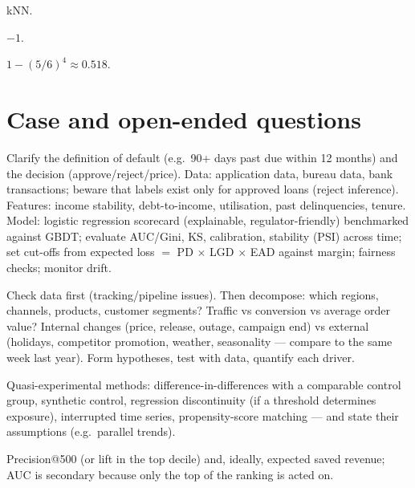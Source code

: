 \A kNN.

\A $-1$.

\A $1-(5/6)^4\approx0.518$.

\section{Case and open-ended questions}
\A Clarify the definition of default (e.g.\ 90+ days past due within 12 months) and the decision (approve/reject/price). Data: application data, bureau data, bank transactions; beware that labels exist only for approved loans (reject inference). Features: income stability, debt-to-income, utilisation, past delinquencies, tenure. Model: logistic regression scorecard (explainable, regulator-friendly) benchmarked against GBDT; evaluate AUC/Gini, KS, calibration, stability (PSI) across time; set cut-offs from expected loss $=$ PD $\times$ LGD $\times$ EAD against margin; fairness checks; monitor drift.

\A Check data first (tracking/pipeline issues). Then decompose: which regions, channels, products, customer segments? Traffic vs conversion vs average order value? Internal changes (price, release, outage, campaign end) vs external (holidays, competitor promotion, weather, seasonality --- compare to the same week last year). Form hypotheses, test with data, quantify each driver.

\A Quasi-experimental methods: difference-in-differences with a comparable control group, synthetic control, regression discontinuity (if a threshold determines exposure), interrupted time series, propensity-score matching --- and state their assumptions (e.g.\ parallel trends).

\A Precision@500 (or lift in the top decile) and, ideally, expected saved revenue; AUC is secondary because only the top of the ranking is acted on.

